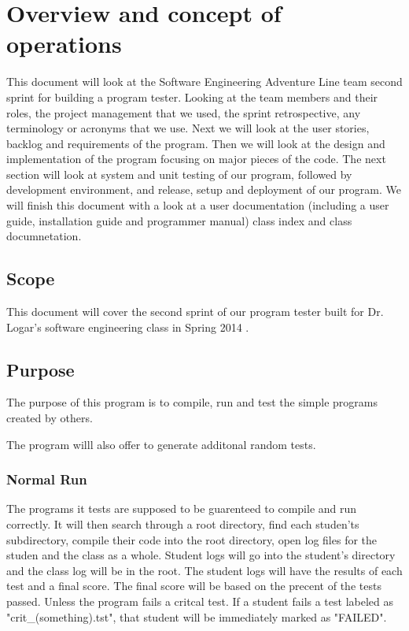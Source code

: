 
\chapter{Overview and concept of operations}

This document will look at the Software Engineering Adventure Line team second sprint for building
a program tester. Looking at the team members and their roles, the project
management that we used, the sprint retrospective, any terminology or acronyms
that we use. Next we will look at the user stories, backlog and requirements of the
program. Then we will look at the design and implementation of the program focusing
on major pieces of the code. The next section will look at system and unit testing of 
our program, followed by development environment, and release, setup and
deployment of our program. We will finish this document with a look at a user 
documentation (including a user guide, installation guide and programmer manual)
class index and class documnetation.


\section{Scope}
This document will cover the second sprint of our program tester built for Dr. Logar's
software engineering class in Spring 2014 .


\section{Purpose}
The purpose of this program is to compile, run and test the simple programs created by others. 

The program willl also offer to generate additonal random tests.

\subsection{Normal Run}
The programs it tests are supposed to be guarenteed to compile and run correctly. It will then search through a root directory, find each studen'ts
subdirectory, compile their code into the root directory, open log files for the studen and the class as a whole. Student logs will
go into the student's directory and the class log will be in the root. The student logs will have the results of each test and a final
score. The final score will be based on the precent of the tests passed. Unless the program fails a critcal test. If a student fails a 
test labeled as "crit\_(something).tst", that student will be immediately marked as "FAILED".

